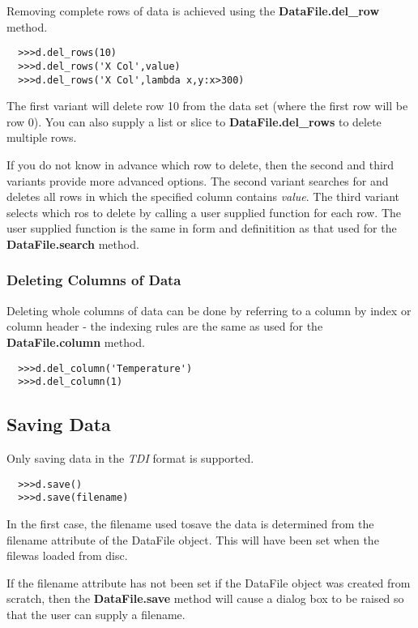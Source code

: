 \documentclass[a4paper,11pt]{scrartcl}
\begin{document}
Removing complete rows of data is achieved using the \textbf{DataFile.del\_row} method.

\begin{verbatim}
  >>>d.del_rows(10)
  >>>d.del_rows('X Col',value)
  >>>d.del_rows('X Col',lambda x,y:x>300)
\end{verbatim}

The first variant will delete row 10 from the data set (where the first row will be row 0). You can also supply a list or slice to \textbf{DataFile.del\_rows} to delete multiple rows.

If you do not know in advance which row to delete, then the second and third variants provide more advanced options. The second variant searches for and deletes all rows in which the specified column contains \textit{value}. The third variant selects which ros to delete by calling a user supplied function for each row. The user supplied function is the same in form and definitition as that used for the \textbf{DataFile.search} method.

\subsubsection{Deleting Columns of Data}

Deleting whole columns of data can be done by referring to a column by index or column header - the indexing rules are the same as used for the \textbf{DataFile.column} method.

\begin{verbatim}
  >>>d.del_column('Temperature')
  >>>d.del_column(1)
\end{verbatim}

\subsection{Saving Data}

Only saving data in the \textit{TDI} format is supported.

\begin{verbatim}
  >>>d.save()
  >>>d.save(filename)
\end{verbatim}

In the first case, the filename used tosave the data is determined from the filename attribute of the DataFile object. This will have been set when the filewas loaded from disc.

If the filename attribute has not been set \eg if the DataFile object was created from scratch, then the \textbf{DataFile.save} method will cause a dialog box to be raised so that the user can supply a filename.
\end{document}
